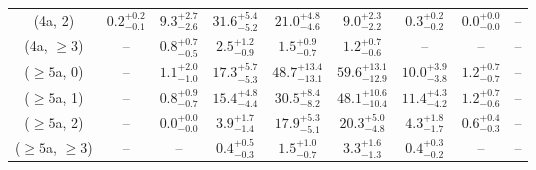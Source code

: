 \begin{table}[h!]
{\begin{tabular}{ccccccccc}
	(4a, 2) & $0.2^{+ 0.2 }_{- 0.1 }$ & $9.3^{+ 2.7 }_{- 2.6 }$ & $31.6^{+ 5.4 }_{- 5.2 }$ & $21.0^{+ 4.8 }_{- 4.6 }$ & $9.0^{+ 2.3 }_{- 2.2 }$ & $0.3^{+ 0.2 }_{- 0.2 }$ & $0.0^{+ 0.0 }_{- 0.0 }$ & -- \\[0.5ex] 
	(4a, $\ge3$) & -- & $0.8^{+ 0.7 }_{- 0.5 }$ & $2.5^{+ 1.2 }_{- 0.9 }$ & $1.5^{+ 0.9 }_{- 0.7 }$ & $1.2^{+ 0.7 }_{- 0.6 }$ & -- & -- & -- \\[0.5ex] 
	($\ge5$a, 0) & -- & $1.1^{+ 2.0 }_{- 1.0 }$ & $17.3^{+ 5.7 }_{- 5.3 }$ & $48.7^{+ 13.4 }_{- 13.1 }$ & $59.6^{+ 13.1 }_{- 12.9 }$ & $10.0^{+ 3.9 }_{- 3.8 }$ & $1.2^{+ 0.7 }_{- 0.7 }$ & -- \\[0.5ex] 
	($\ge5$a, 1) & -- & $0.8^{+ 0.9 }_{- 0.7 }$ & $15.4^{+ 4.8 }_{- 4.4 }$ & $30.5^{+ 8.4 }_{- 8.2 }$ & $48.1^{+ 10.6 }_{- 10.4 }$ & $11.4^{+ 4.3 }_{- 4.2 }$ & $1.2^{+ 0.7 }_{- 0.6 }$ & -- \\[0.5ex] 
	($\ge5$a, 2) & -- & $0.0^{+ 0.0 }_{- 0.0 }$ & $3.9^{+ 1.7 }_{- 1.4 }$ & $17.9^{+ 5.3 }_{- 5.1 }$ & $20.3^{+ 5.0 }_{- 4.8 }$ & $4.3^{+ 1.8 }_{- 1.7 }$ & $0.6^{+ 0.4 }_{- 0.3 }$ & -- \\[0.5ex] 
	($\ge5$a, $\ge3$) & -- & -- & $0.4^{+ 0.5 }_{- 0.3 }$ & $1.5^{+ 1.0 }_{- 0.7 }$ & $3.3^{+ 1.6 }_{- 1.3 }$ & $0.4^{+ 0.3 }_{- 0.2 }$ & -- & -- \\[0.5ex] 
	\hline
	\hline
\end{tabular}}
\end{table}
